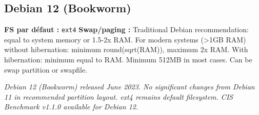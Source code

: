 \documentclass[10pt,a4paper]{article}
\begin{document}
\subsection{Debian 12 (Bookworm)}
\noindent\small \textbf{FS par d\'efaut :} \texttt{ext4} \quad\textbullet\quad \textbf{Swap/paging :} Traditional Debian recommendation: equal to system memory or 1.5-2x RAM. For modern systems (>1GB RAM) without hibernation: minimum round(sqrt(RAM)), maximum 2x RAM. With hibernation: minimum equal to RAM. Minimum 512MB in most cases. Can be swap partition or swapfile.\normalsize\par\smallskip
\noindent\small\textit{Debian 12 (Bookworm) released June 2023. No significant changes from Debian 11 in recommended partition layout. ext4 remains default filesystem. CIS Benchmark v1.1.0 available for Debian 12.}\normalsize\par\smallskip
\end{document}
